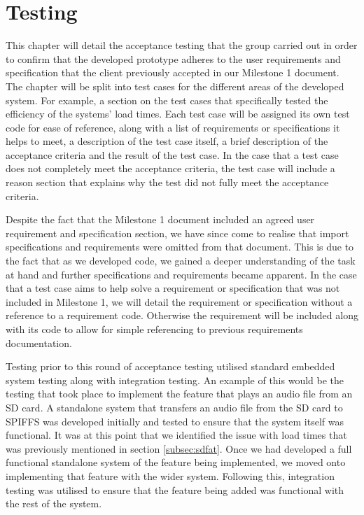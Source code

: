 \chapter{Testing}
\label{ch:testing}

    This chapter will detail the acceptance testing that the group carried out in order to confirm that the developed prototype adheres to the user requirements and specification that the client previously accepted in our Milestone 1 document. The chapter will be split into test cases for the different areas of the developed system. For example, a section on the test cases that specifically tested the efficiency of the systems' load times. Each test case will be assigned its own test code for ease of reference, along with a list of requirements or specifications it helps to meet, a description of the test case itself, a brief description of the acceptance criteria and the result of the test case. In the case that a test case does not completely meet the acceptance criteria, the test case will include a reason section that explains why the test did not fully meet the acceptance criteria.
    
    Despite the fact that the Milestone 1 document included an agreed user requirement and specification section, we have since come to realise that import specifications and requirements were omitted from that document. This is due to the fact that as we developed code, we gained a deeper understanding of the task at hand and further specifications and requirements became apparent. In the case that a test case aims to help solve a requirement or specification that was not included in Milestone 1, we will detail the requirement or specification without a reference to a requirement code. Otherwise the requirement will be included along with its code to allow for simple referencing to previous requirements documentation.

    Testing prior to this round of acceptance testing utilised standard embedded system testing along with integration testing. An example of this would be the testing that took place to implement the feature that plays an audio file from an SD card. A standalone system that transfers an audio file from the SD card to SPIFFS was developed initially and tested to ensure that the system itself was functional. It was at this point that we identified the issue with load times that was previously mentioned in section \ref{subsec:sdfat}. Once we had developed a full functional standalone system of the feature being implemented, we moved onto implementing that feature with the wider system. Following this, integration testing was utilised to ensure that the feature being added was functional with the rest of the system.

